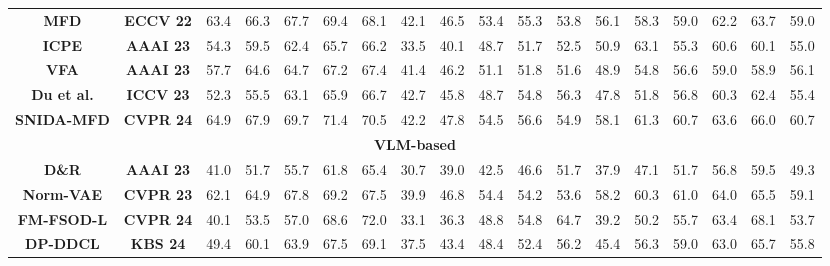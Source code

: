 \documentclass[10pt,twocolumn,letterpaper]{article}
\begin{document}
\begin{table}[t]
{\begin{tabular}{cccccccccccccccccc}
    \textbf{MFD \cite{wu2022mfd2}} & \multicolumn{1}{c|}{\textbf{ECCV 22}} & 63.4 & 66.3 & 67.7 & 69.4 & \multicolumn{1}{c|}{68.1} & 42.1 & 46.5 & 53.4 & 55.3 & \multicolumn{1}{c|}{53.8} & 56.1 & 58.3 & 59.0 & 62.2 & \multicolumn{1}{c|}{63.7} & 59.0 \\
    \textbf{ICPE \cite{lu2023ICPE}} & \multicolumn{1}{c|}{\textbf{AAAI 23}} & 54.3 & 59.5 & 62.4 & 65.7 & \multicolumn{1}{c|}{66.2} & 33.5 & 40.1 & 48.7 & 51.7 & \multicolumn{1}{c|}{52.5} & 50.9 & 63.1 & 55.3 & 60.6 & \multicolumn{1}{c|}{60.1} & 55.0 \\
    \textbf{VFA \cite{han2023vfa}} & \multicolumn{1}{c|}{\textbf{AAAI 23}} & 57.7 & 64.6 & 64.7 & 67.2 & \multicolumn{1}{c|}{67.4} & 41.4 & 46.2 & 51.1 & 51.8 & \multicolumn{1}{c|}{51.6} & 48.9 & 54.8 & 56.6 & 59.0 & \multicolumn{1}{c|}{58.9} & 56.1 \\
    \textbf{Du et al. \cite{Du_2023_ICCV}} & \multicolumn{1}{c|}{\textbf{ICCV 23}} & 52.3 & 55.5 & 63.1 & 65.9 & \multicolumn{1}{c|}{66.7} & 42.7 & 45.8 & 48.7 & 54.8 & \multicolumn{1}{c|}{56.3} & 47.8 & 51.8 & 56.8 & 60.3 & \multicolumn{1}{c|}{62.4} & 55.4 \\
    \textbf{SNIDA-MFD \cite{wang2024snida2}} & \multicolumn{1}{c|}{\textbf{CVPR 24}} & 64.9 & 67.9 & 69.7 & 71.4 & \multicolumn{1}{c|}{70.5} & 42.2 & 47.8 & 54.5 & 56.6 & \multicolumn{1}{c|}{54.9} & 58.1 & 61.3 & 60.7 & 63.6 & \multicolumn{1}{c|}{66.0} & 60.7 \\ \hline
    \multicolumn{18}{c}{\textbf{VLM-based}} \\ \hline
    \textbf{D\&R \cite{li2023dr}} & \multicolumn{1}{c|}{\textbf{AAAI 23}} & 41.0 & 51.7 & 55.7 & 61.8 & \multicolumn{1}{c|}{65.4} & 30.7 & 39.0 & 42.5 & 46.6 & \multicolumn{1}{c|}{51.7} & 37.9 & 47.1 & 51.7 & 56.8 & \multicolumn{1}{c|}{59.5} & 49.3 \\
    \textbf{Norm-VAE \cite{xu2023normvae}} & \multicolumn{1}{c|}{\textbf{CVPR 23}} & 62.1 & 64.9 & 67.8 & 69.2 & \multicolumn{1}{c|}{67.5} & 39.9 & 46.8 & 54.4 & 54.2 & \multicolumn{1}{c|}{53.6} & 58.2 & 60.3 & 61.0 & 64.0 & \multicolumn{1}{c|}{65.5} & 59.1 \\
    \textbf{FM-FSOD-L \cite{Han_2024_FM-FSOD}} & \multicolumn{1}{c|}{\textbf{CVPR 24}} & 40.1 & 53.5 & 57.0 & 68.6 & \multicolumn{1}{c|}{72.0} & 33.1 & 36.3 & 48.8 & 54.8 & \multicolumn{1}{c|}{64.7} & 39.2 & 50.2 & 55.7 & 63.4 & \multicolumn{1}{c|}{68.1} & 53.7 \\
    \textbf{DP-DDCL \cite{guo2024DP-DDCL}} & \multicolumn{1}{c|}{\textbf{KBS 24}} & 49.4 & 60.1 & 63.9 & 67.5 & \multicolumn{1}{c|}{69.1} & 37.5 & 43.4 & 48.4 & 52.4 & \multicolumn{1}{c|}{56.2} & 45.4 & 56.3 & 59.0 & 63.0 & \multicolumn{1}{c|}{65.7} & 55.8 \\

\end{tabular}}
\end{table}
\end{document}
